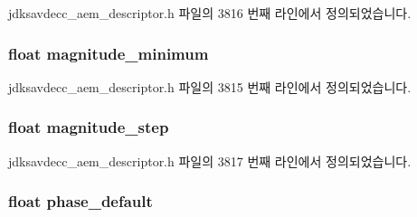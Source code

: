jdksavdecc\+\_\+aem\+\_\+descriptor.\+h 파일의 3816 번째 라인에서 정의되었습니다.

\subsubsection[{\texorpdfstring{magnitude\+\_\+minimum}{magnitude_minimum}}]{\setlength{\rightskip}{0pt plus 5cm}float magnitude\+\_\+minimum}\hypertarget{structjdksavdecc__values__bode__plot_ad49b5753eec6d1f52031437ff3aebd32}{}\label{structjdksavdecc__values__bode__plot_ad49b5753eec6d1f52031437ff3aebd32}


jdksavdecc\+\_\+aem\+\_\+descriptor.\+h 파일의 3815 번째 라인에서 정의되었습니다.

\subsubsection[{\texorpdfstring{magnitude\+\_\+step}{magnitude_step}}]{\setlength{\rightskip}{0pt plus 5cm}float magnitude\+\_\+step}\hypertarget{structjdksavdecc__values__bode__plot_a1ce8f90a7972ff2257328d8616e98e51}{}\label{structjdksavdecc__values__bode__plot_a1ce8f90a7972ff2257328d8616e98e51}


jdksavdecc\+\_\+aem\+\_\+descriptor.\+h 파일의 3817 번째 라인에서 정의되었습니다.

\subsubsection[{\texorpdfstring{phase\+\_\+default}{phase_default}}]{\setlength{\rightskip}{0pt plus 5cm}float phase\+\_\+default}\hypertarget{structjdksavdecc__values__bode__plot_acbb532133ed4fca28d4d904470007758}{}\label{structjdksavdecc__values__bode__plot_acbb532133ed4fca28d4d904470007758}



